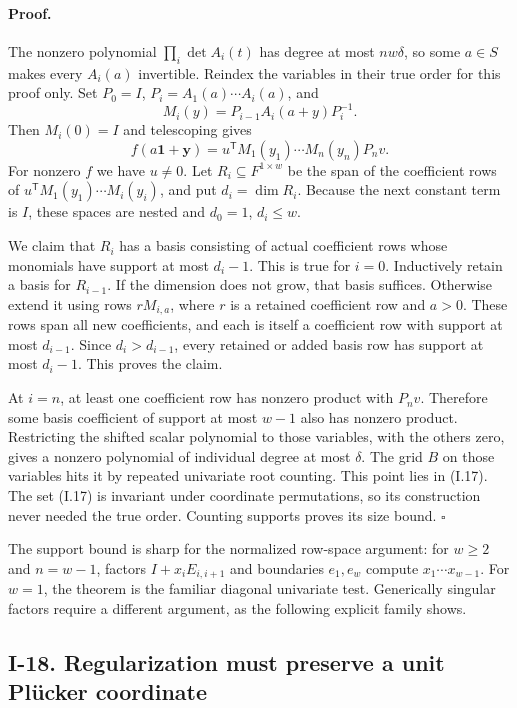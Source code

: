 \paragraph{Proof.}
The nonzero polynomial $\prod_i\det A_i(t)$ has degree at most
$nw\delta$, so some $a\in S$ makes every $A_i(a)$ invertible.
Reindex the variables in their true order for this proof only.
Set $P_0=I$, $P_i=A_1(a)\cdots A_i(a)$, and
\[
 M_i(y)=P_{i-1}A_i(a+y)P_i^{-1}.
\]
Then $M_i(0)=I$ and telescoping gives
\[
 f(a\mathbf1+\mathbf y)
    =u^{\mathsf T}M_1(y_1)\cdots M_n(y_n)P_nv.
\]
For nonzero $f$ we have $u\ne0$.  Let $R_i\subseteq F^{1\times w}$
be the span of the coefficient rows of
$u^{\mathsf T}M_1(y_1)\cdots M_i(y_i)$, and put $d_i=\dim R_i$.
Because the next constant term is $I$, these spaces are nested and
$d_0=1$, $d_i\le w$.

We claim that $R_i$ has a basis consisting of actual coefficient
rows whose monomials have support at most $d_i-1$.  This is true for
$i=0$.  Inductively retain a basis for $R_{i-1}$.  If the dimension
does not grow, that basis suffices.  Otherwise extend it using rows
$rM_{i,a}$, where $r$ is a retained coefficient row and $a>0$.
These rows span all new coefficients, and each is itself a coefficient
row with support at most $d_{i-1}$.  Since $d_i>d_{i-1}$, every
retained or added basis row has support at most $d_i-1$.
This proves the claim.

At $i=n$, at least one coefficient row has nonzero product with
$P_nv$.  Therefore some basis coefficient of support at most $w-1$
also has nonzero product.  Restricting the shifted scalar polynomial
to those variables, with the others zero, gives a nonzero polynomial
of individual degree at most $\delta$.  The grid $B$ on those
variables hits it by repeated univariate root counting.  This point
lies in (I.17).  The set (I.17) is invariant under coordinate
permutations, so its construction never needed the true order.
Counting supports proves its size bound. \hfill$\square$

The support bound is sharp for the normalized row-space argument:
for $w\ge2$ and $n=w-1$, factors $I+x_iE_{i,i+1}$ and boundaries $e_1,e_w$
compute $x_1\cdots x_{w-1}$.  For $w=1$, the theorem is the familiar
diagonal univariate test.  Generically singular factors require a
different argument, as the following explicit family shows.

\subsection{I-18. Regularization must preserve a unit Pl\"ucker coordinate}
\label{I-18}

